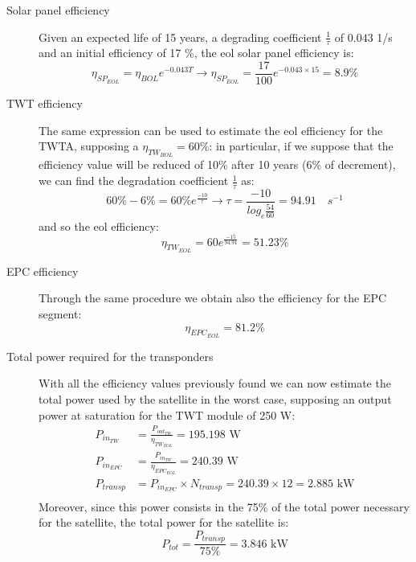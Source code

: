 \documentclass[11pt,a4paper,titlepage]{article}
\begin{document}
\begin{description}
	\item[Solar panel efficiency] Given an expected life of 15 years, a degrading coefficient $\frac{1}{\tau}$ of $0.043$ 1/s and an initial efficiency of 17 \%, the \gls{eol} solar panel efficiency is:
		\begin{equation}
			\eta_{SP_{EOL}} = \eta_{BOL}e^{-0.043T} \rightarrow \eta_{SP_{EOL}} = \frac{17}{100}e^{-0.043\times 15} = 8.9 \%
		\end{equation}
	\item[TWT efficiency] The same expression can be used to estimate the \gls{eol} efficiency for the TWTA, supposing a $\eta_{TW_{BOL}} = 60\%$: in particular, if we suppose that the efficiency value will be reduced of 10\% after 10 years (6\% of decrement), we can find the degradation coefficient $\frac{1}{\tau}$ as:
		\begin{equation}
		60 \% - 6 \% =60 \% e^{\frac{-10}{\tau}} \rightarrow \tau = \frac{-10}{log_e\frac{54}{60}} = 94.91 \quad s^{-1}
		\end{equation}
		and so the \gls{eol} efficiency:
		\begin{equation}
		\eta_{TW_{EOL}} = 60e^{\frac{-15}{94.91}} = 51.23 \%
		\end{equation}
	\item[EPC efficiency] Through the same procedure we obtain also the efficiency for the EPC segment:
		\begin{equation}
		\eta_{EPC_{EOL}} = 81.2 \%
		\end{equation}
	\item[Total power required for the transponders] With all the efficiency values previously found we can now estimate the total power used by the satellite in the worst case, supposing an output power at saturation for the TWT module of 250 W:
		\begin{align}
		P_{in_{TW}} &= \frac{P_{out_{TW}}}{\eta_{TW_{EOL}}} = 195.198 \text{ W}\\
		P_{in_{EPC}} &= \frac{P_{in_{TW}}}{\eta_{EPC_{EOL}}} = 240.39 \text{ W}\\
		P_{transp} &= P_{in_{EPC}} \times N_{transp} = 240.39 \times 12 = 2.885 \text{ kW}\\
		\end{align}
		Moreover, since this power consists in the 75\% of the total power necessary for the satellite, the total power for the satellite is:
		\begin{equation}
		P_{tot} = \frac{P_{transp}}{75\%} = 3.846 \text{ kW}
		\end{equation}
\end{description}
\end{document}
